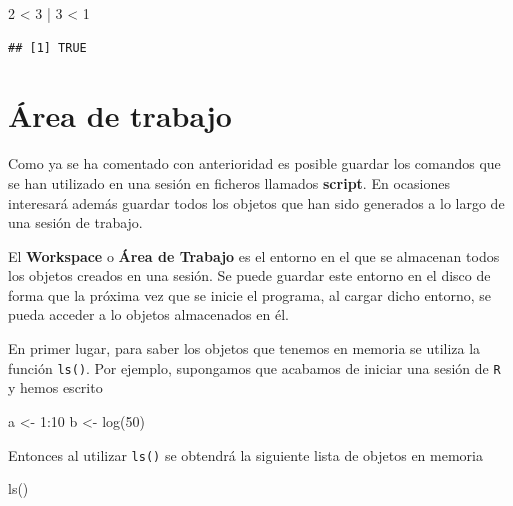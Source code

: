 \documentclass[
]{book}
\newenvironment{Shaded}{\begin{snugshade}}{\end{snugshade}}
\newcommand{\DecValTok}[1]{\textcolor[rgb]{0.00,0.00,0.81}{#1}}
\newcommand{\FunctionTok}[1]{\textcolor[rgb]{0.00,0.00,0.00}{#1}}
\newcommand{\NormalTok}[1]{#1}
\newcommand{\OtherTok}[1]{\textcolor[rgb]{0.56,0.35,0.01}{#1}}
\newcommand{\SpecialCharTok}[1]{\textcolor[rgb]{0.00,0.00,0.00}{#1}}
\theoremstyle{break}
\theoremstyle{nonumberplain}
\begin{document}
\begin{Shaded}
\begin{Highlighting}[]
\DecValTok{2} \SpecialCharTok{\textless{}} \DecValTok{3} \SpecialCharTok{|} \DecValTok{3} \SpecialCharTok{\textless{}} \DecValTok{1}
\end{Highlighting}
\end{Shaded}

\begin{verbatim}
## [1] TRUE
\end{verbatim}

\hypertarget{uxe1rea-de-trabajo}{%
\section{Área de trabajo}\label{uxe1rea-de-trabajo}}

Como ya se ha comentado con anterioridad es posible guardar los comandos que se han utilizado en una sesión en ficheros llamados \textbf{script}.
En ocasiones interesará además guardar todos los objetos que han sido generados a lo largo de una sesión de trabajo.

El \textbf{Workspace} o \textbf{Área de Trabajo} es el entorno en el que se almacenan todos los objetos creados en una sesión.
Se puede guardar este entorno en el disco de forma que la próxima vez que se inicie el programa, al cargar dicho entorno, se pueda acceder a lo objetos almacenados en él.

En primer lugar, para saber los objetos que tenemos en memoria se utiliza la función \texttt{ls()}.
Por ejemplo, supongamos que acabamos de iniciar una sesión de \texttt{R} y hemos escrito

\begin{Shaded}
\begin{Highlighting}[]
\NormalTok{a }\OtherTok{\textless{}{-}} \DecValTok{1}\SpecialCharTok{:}\DecValTok{10}
\NormalTok{b }\OtherTok{\textless{}{-}} \FunctionTok{log}\NormalTok{(}\DecValTok{50}\NormalTok{)}
\end{Highlighting}
\end{Shaded}

Entonces al utilizar \texttt{ls()} se obtendrá la siguiente lista de objetos en memoria

\begin{Shaded}
\begin{Highlighting}[]
\FunctionTok{ls}\NormalTok{()}
\end{Highlighting}
\end{Shaded}
\end{document}
